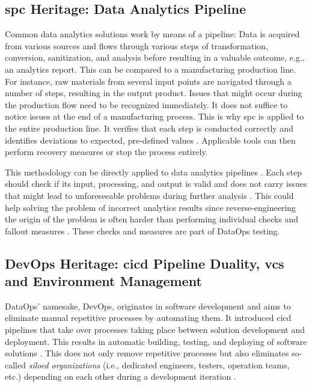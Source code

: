 \subsection{\acs{spc} Heritage: Data Analytics Pipeline}
Common data analytics solutions work by means of a pipeline: Data is acquired from various sources and flows through various steps of transformation, conversion, sanitization, and analysis before resulting in a valuable outcome, e.g., an analytics report. This can be compared to a manufacturing production line. For instance, raw materials from several input points are navigated through a number of steps, resulting in the output product. Issues that might occur during the production flow need to be recognized immediately. It does not suffice to notice issues at the end of a manufacturing process. This is why \acf{spc} is applied to the entire production line. It verifies that each step is conducted correctly and identifies deviations to expected, pre-defined values \cite[1]{Knoth2002}. Applicable tools can then perform recovery measures or stop the process entirely.

This methodology can be directly applied to data analytics pipelines \cite[27]{Bergh2019}. Each step should check if its input, processing, and output is valid and does not carry issues that might lead to unforeseeable problems during further analysis \cite{DataKitchen2020a}. This could help solving the problem of incorrect analytics results since reverse-engineering the origin of the problem is often harder than performing individual checks and fallout measures \cite{Redman2020}. These checks and measures are part of DataOps testing.

\subsection{DevOps Heritage: \acs{cicd} Pipeline Duality, \acs{vcs} and Environment Management} \label{sec:2-1-devops}
DataOps' namesake, DevOps, originates in software development and aims to eliminate manual repetitive processes by automating them. It introduced \acf{cicd} pipelines that take over processes taking place between solution development and deployment. This results in automatic building, testing, and deploying of software solutions \cite[21\psqq]{Kaiser}. This does not only remove repetitive processes but also eliminates so-called \textit{siloed organizations} (i.e., dedicated engineers, testers, operation teams, etc.) depending on each other during a development iteration \cite[56]{Bergh2019}.

